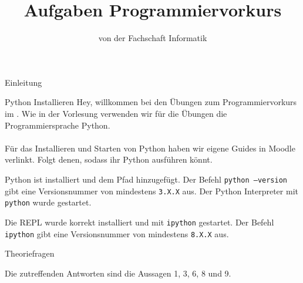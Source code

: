 
\title{Aufgaben Programmiervorkurs}
\subtitle{von der Fachschaft Informatik\hfill\ptitle}

\usepackage{hyperref}
\usepackage{wrapfig}
\usepackage{footnote}


\maketitle{}

\begin{task}[points=auto]{Einleitung}
    \begin{subtask*}[points=0]{Python Installieren}
        Hey, willkommen bei den Übungen zum Programmiervorkurs im \ptitle. Wie in der
        Vorlesung verwenden wir für die Übungen die Programmiersprache Python. \\\\
        Für das Installieren und Starten von Python haben wir eigene Guides in Moodle verlinkt.
        Folgt denen, sodass ihr Python ausführen könnt.
        \begin{solution}
            Python ist installiert und dem Pfad hinzugefügt. Der Befehl
            \texttt{python --version} gibt eine Versionsnummer von mindestens \texttt{3.X.X} aus.
            Der Python Interpreter mit \texttt{python} wurde gestartet.

            Die REPL wurde korrekt installiert und mit \texttt{ipython} gestartet. Der Befehl
            \texttt{ipython} gibt eine Versionsnummer von mindestens \texttt{8.X.X} aus.
        \end{solution}
    \end{subtask*}
    \begin{subtask*}[points=0]{Theoriefragen}
        \mccmd
        \begin{enumerate}
            \mchead
        \end{enumerate}
        \begin{solution}
            Die zutreffenden Antworten sind die Aussagen 1, 3, 6, 8 und 9.
        \end{solution}
    \end{subtask*}
\end{task}
